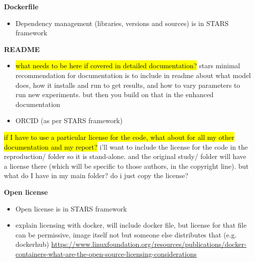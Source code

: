 \textbf{Dockerfile}
\begin{itemize}
    \item Dependency management (libraries, versions and sources) is in STARS framework
\end{itemize}

\textbf{README}
\begin{itemize}
    \item \hl{what needs to be here if covered in detailed documentation?} stars minimal recommendation for documentation is to include in readme about what model does, how it installs and run to get results, and how to vary parameters to run new experiments. but then you build on that in the enhanced documentation
    \item ORCID (as per STARS framework)
\end{itemize}

\hl{if I have to use a particular license for the code, what about for all my other documentation and my report?} i'll want to include the license for the code in the reproduction/ folder so it is stand-alone. and the original study/ folder will have a license there (which will be specific to those authors, in the copyright line). but what do I have in my main folder? do i just copy the license?

\textbf{Open license}
\begin{itemize}
    \item Open license is in STARS framework
    \item explain licensing with docker, will include docker file, but license for that file can be permissive, image itself not but someone else distributes that (e.g. dockerhub) \url{https://www.linuxfoundation.org/resources/publications/docker-containers-what-are-the-open-source-licensing-considerations}
\end{itemize}

